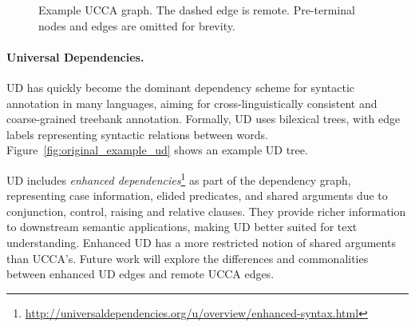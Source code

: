 \documentclass[11pt,a4paper]{article}
\begin{document}
\begin{figure}[!ht]
  \centering
\caption{\label{fig:example_ucca}
 Example UCCA graph. The dashed edge is remote.
  Pre-terminal nodes and edges are omitted for brevity.}
\end{figure}

\paragraph{Universal Dependencies.}\label{sec:ud}
UD \cite{nivre2016universal} has quickly become
the dominant dependency scheme for
syntactic  annotation in many languages,
aiming for cross-linguistically consistent and coarse-grained treebank
annotation. Formally, UD uses bilexical trees, with edge labels 
representing syntactic relations between words.
Figure~\ref{fig:original_example_ud} shows an example UD tree.

UD includes \textit{enhanced dependencies}\footnote{\url{http://universaldependencies.org/u/overview/enhanced-syntax.html}}
as part of the dependency graph, representing
case information, elided predicates,
and shared arguments due to conjunction, control, raising and relative clauses.
They provide richer information to downstream semantic applications,
making UD better suited for text understanding.
Enhanced UD has a more restricted notion of shared arguments than UCCA's.
Future work will explore the differences and commonalities between enhanced UD edges and remote UCCA edges.
\end{document}

